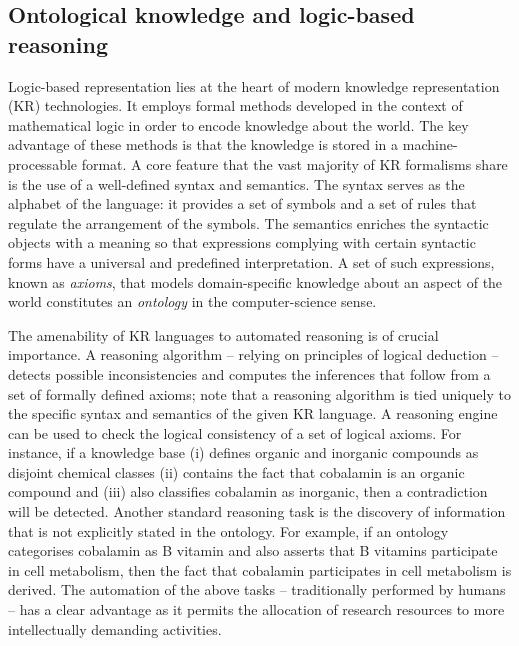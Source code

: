 \documentclass[10pt]{bmc_article}
\newenvironment{bmcformat}{\baselineskip20pt\sloppy\setboolean{publ}{false}}{\baselineskip20pt\sloppy}
\begin{document}
\begin{bmcformat}
\subsection*{Ontological knowledge and logic-based reasoning}
\label{sec:backlogic}

Logic-based representation lies at the heart of modern knowledge representation (KR) technologies. It employs formal methods developed in the context of mathematical logic in order to encode knowledge about the world. The key advantage of these methods is that the knowledge is stored in a machine-processable format. A core feature that the vast majority of KR formalisms share is the use of a well-defined syntax and semantics. The syntax serves as the alphabet of the language: it provides a set of symbols and a set of rules that regulate the arrangement of the symbols. The semantics enriches the syntactic objects with a meaning so that expressions complying with certain syntactic forms have a universal and predefined interpretation. A set of such expressions, known as \textit{axioms}, that models domain-specific knowledge about an aspect of the world constitutes an \emph{ontology} in the computer-science sense. 

The amenability of KR languages to automated reasoning is of crucial importance. A reasoning algorithm -- relying on principles of logical deduction -- detects possible inconsistencies and computes the inferences that follow from a set of formally defined axioms; note that a reasoning algorithm is tied uniquely to the specific syntax and semantics of the given KR language. A reasoning engine can be used to check the logical consistency of a set of logical axioms. For instance, if a knowledge base (i) defines organic and inorganic compounds as disjoint chemical classes (ii) contains the fact that cobalamin is an organic compound and (iii) also classifies cobalamin as inorganic, then a contradiction will be detected. Another standard reasoning task is the discovery of information that is not explicitly stated in the ontology. For example, if an ontology categorises cobalamin as B vitamin and also asserts that B vitamins participate in cell metabolism, then the fact that cobalamin participates in cell metabolism is derived. The automation of the above tasks -- traditionally performed by humans -- has a clear advantage as it permits the allocation of research resources to more intellectually demanding activities.


\end{bmcformat}
\end{document}
